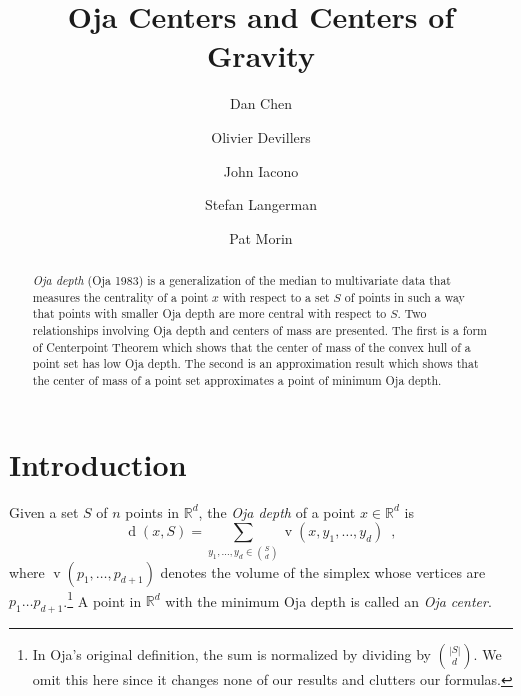 \documentclass[preprint, 12pt]{elsarticle}
\DeclareMathOperator{\od}{d}
\DeclareMathOperator{\vol}{v}
\newcommand{\R}{\mathbb{R}}
\begin{document}
\begin{frontmatter}

\title{Oja Centers and Centers of Gravity}

\author{Dan Chen}
\address{School of Computer Science, Carleton University}

\author{Olivier Devillers}
\address{INRIA Sophia Antipolis — M\'editerran\'ee, France.}

\author{John Iacono}
\address{Department of Computer and Information Science, Polytechnic University}

\author{Stefan Langerman}
\address{D\'epartement d'Informatique, Universit\'e Libre de Bruxelles}

\author{ Pat Morin}
\address{School of Computer Science, Carleton University}


\begin{abstract}
\emph{Oja depth} (Oja 1983) is a generalization of the median to
multivariate data that measures the centrality of a point $x$ with respect
to a set $S$ of points in such a way that points with smaller Oja depth
are more central with respect to $S$.  Two relationships involving
Oja depth and centers of mass are presented.  The first is a form of
Centerpoint Theorem which shows that the center of mass of the convex
hull of a point set has low Oja depth.  The second is an approximation
result which shows that the center of mass of a point set approximates
a point of minimum Oja depth.
\end{abstract}


\end{frontmatter}

\section{Introduction}

Given a set $S$ of $n$ points in $\mathbb{R}^{d}$, the \emph{Oja depth}
\cite{Oja83} of a point $x\in\R^d$ is
\[ 
   \od(x, S) 
      = \sum_{y_{1},\ldots , y_{d} \in \binom{S}{d}} 
         \vol(x, y_{1}, \ldots, y_{d}) \enspace ,
\]
where $\vol(p_{1},\ldots, p_{d+1})$ denotes the volume of the simplex
whose vertices are $p_{1}\ldots p_{d+1}$.\footnote{In Oja's original
definition, the sum is normalized by dividing by $\binom{|S|}{d}$. We omit this here since it changes none of our results and clutters our formulas.}
A point in $\mathbb{R}^{d}$ with the minimum Oja depth is called an
\emph{Oja center}.
\end{document}
